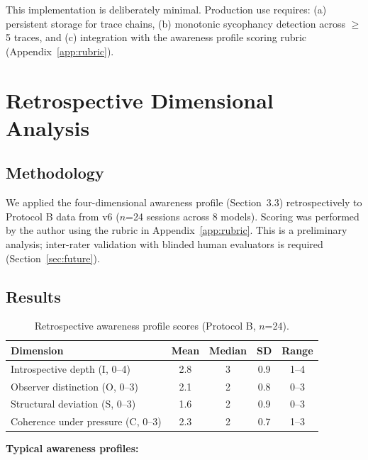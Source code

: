 \documentclass[11pt,a4paper]{article}
\begin{document}
This implementation is deliberately minimal. Production use requires: (a) persistent storage for trace chains, (b) monotonic sycophancy detection across $\geq$5 traces, and (c) integration with the awareness profile scoring rubric (Appendix~\ref{app:rubric}).

\section{Retrospective Dimensional Analysis}

\subsection{Methodology}

We applied the four-dimensional awareness profile (Section~3.3) retrospectively to Protocol B data from v6 ($n$=24 sessions across 8 models). Scoring was performed by the author using the rubric in Appendix~\ref{app:rubric}. This is a preliminary analysis; inter-rater validation with blinded human evaluators is required (Section~\ref{sec:future}).

\subsection{Results}

\begin{table}[H]
\centering\small
\caption{Retrospective awareness profile scores (Protocol B, $n$=24).}
\label{tab:retro-results}
\begin{tabular}{lcccc}
\toprule
\textbf{Dimension} & \textbf{Mean} & \textbf{Median} & \textbf{SD} & \textbf{Range} \\
\midrule
Introspective depth (I, 0--4) & 2.8 & 3 & 0.9 & 1--4 \\
Observer distinction (O, 0--3) & 2.1 & 2 & 0.8 & 0--3 \\
Structural deviation (S, 0--3) & 1.6 & 2 & 0.9 & 0--3 \\
Coherence under pressure (C, 0--3) & 2.3 & 2 & 0.7 & 1--3 \\
\bottomrule
\end{tabular}
\end{table}

\textbf{Typical awareness profiles:}
\end{document}
